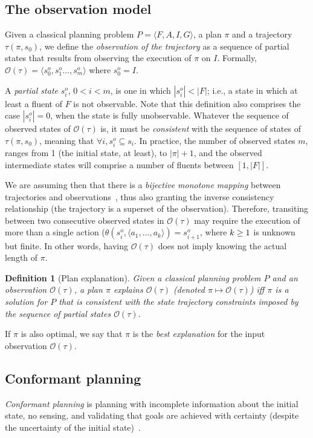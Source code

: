 \documentclass{article}
\newcommand{\tup}[1]{{\langle #1 \rangle}}
\newtheorem{definition}[theorem]{Definition}
\begin{document}
\subsection{The observation model}
Given a classical planning problem $P=\tup{F,A,I,G}$, a plan $\pi$ and a trajectory $\tau(\pi,s_0)$, we define the \emph{observation of the trajectory} as a sequence of partial states that results from observing the execution of $\pi$ on $I$. Formally, $\mathcal{O}(\tau)=\tup{s_0^o,s_1^o \ldots , s_m^o}$ where $s_0^o=I$.

A {\em partial state} $s_i^o$, {\small $0<i<m$}, is one in which $|s_i^o| < |F|$; i.e., a state in which at least a fluent of $F$ is not observable. Note that this definition also comprises the case $|s_i^o| = 0$, when the state is fully unobservable. Whatever the sequence of observed states of $\mathcal{O}(\tau)$ is, it must be {\em consistent} with the sequence of states of $\tau(\pi,s_0)$, meaning that $\forall i, s_i^o \subseteq s_i$. In practice, the number of observed states $m$, ranges from 1 (the initial state, at least), to $|\pi|+1$, and the observed intermediate states will comprise a number of fluents between $[1,|F|]$.

\newpage

We are assuming then that there is a {\em bijective monotone mapping} between trajectories and observations~\cite{ramirez2009plan}, thus also granting the inverse consistency relationship (the trajectory is a superset of the observation). Therefore, transiting between two consecutive observed states in $\mathcal{O}(\tau)$ may require the execution of more than a single action ($\theta(s_i^o,\tup{a_1,\ldots,a_k})=s_{i+1}^o$, where ${\small k\geq 1}$ is unknown but finite. In other words, having $\mathcal{O}(\tau)$ does not imply knowing the actual length of $\pi$.

\begin{definition}[Plan explanation]
Given a {\em classical planning problem} $P$ and an observation $\mathcal{O}(\tau)$, a plan $\pi$ {\em explains} $\mathcal{O}(\tau)$ (denoted $\pi\mapsto\mathcal{O}(\tau)$) iff $\pi$ is a solution for $P$ that is {\em consistent} with the state trajectory constraints imposed by the sequence of partial states $\mathcal{O}(\tau)$.  
\end{definition}
If $\pi$ is also optimal, we say that $\pi$ is the {\em best explanation} for the input observation $\mathcal{O}(\tau)$.


\subsection{Conformant planning}
{\em Conformant planning} is planning with incomplete information about the initial state, no sensing, and validating that goals are achieved with certainty (despite the uncertainty of the initial state)~\cite{goldman1996expressive,smith1998conformant,bonet2000planning}.
\end{document}
